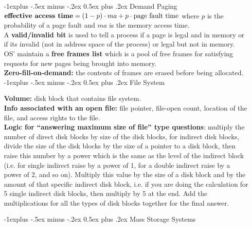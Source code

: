 \documentclass[letterpaper, 8pt]{extarticle}
\makeatletter
\renewcommand{\section}{\@startsection{section}{1}{0mm}%
                                {-1explus -.5ex minus -.2ex}%
                                {0.5ex plus .2ex}%
                                {\normalfont\normalsize\bfseries}}
\renewcommand{\subsection}{\@startsection{subsection}{2}{0mm}%
                                {-1explus -.5ex minus -.2ex}%
                                {0.5ex plus .2ex}%
                                {\normalfont\small\bfseries}}
\makeatother
\begin{document}
\begin{multicols*}{6}
    \subsection{Demand Paging}
    $\text{\textbf{effective access time}} = (1-p) \cdot ma + p \cdot \text
        {page fault time}$ where $p$ is the probability of a page fault and $ma$
    is the memory access time.\\
    A \textbf{valid/invalid bit} is used to tell a process if a page is legal
    and in memory or if its invalid (not in address space of the process) or
    legal but not in memory.\\
    OS' maintain a \textbf{free frames list} which is a pool of free frames for 
    satisfying requests for new pages being brought into memory.\\
    \textbf{Zero-fill-on-demand:} the contents of frames are erased before 
    being allocated.\\

    \section{File System}

    \textbf{Volume:} disk block that contains file system.\\

    \textbf{Info associated with an open file:} file pointer, file-open count, 
    location of the file, and access rights to the file.\\

    \textbf{Logic for ``answering maximum size of file'' type questions}: multiply the
    number of direct disk blocks by size of the disk blocks, for indirect
    disk blocks, divide the size of the disk blocks by the size of a pointer to
    a disk block, then raise this number by a power which is the same as the
    level of the indirect block (i.e. for single indirect raise by a power of
    1, for a double indirect raise by a power of 2, and so on).
    Multiply this value
    by the size of a disk block and by the amount of that specific indirect
    disk block, i.e. if you are doing the calculation for 5 single indirect
    disk blocks, then multiply by 5 at the end. Add the multiplications
    for all the types of disk blocks together for the final answer.

    \section{Mass Storage Systems}

\end{multicols*}
\end{document}
